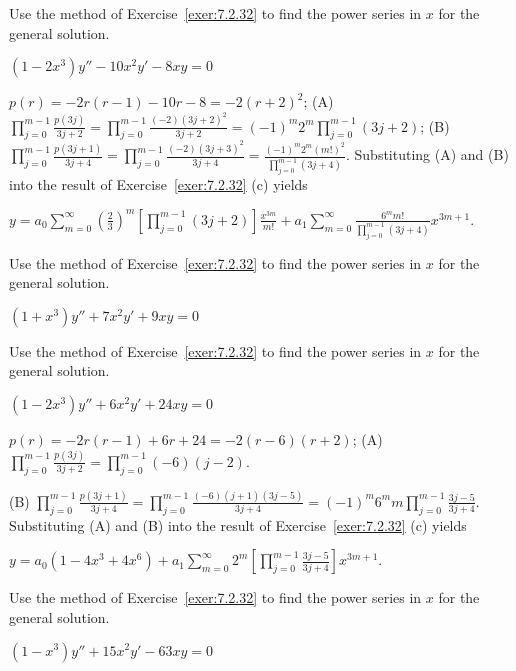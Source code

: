 \documentclass{ximera}
\begin{document}
\begin{problem}\label{exer:7.2.34}
Use the method of
Exercise~\ref{exer:7.2.32}  to find the power series in
$x$ for the general solution.

$(1-2x^3)y''-10x^2y'-8xy=0$

\begin{solution}
    $p(r)=-2r(r-1)-10r-8=-2(r+2)^2$;
(A) $\prod_{j=0}^{m-1}\frac{p(3j)}{3j+2}=
\prod_{j=0}^{m-1}\frac{(-2)(3j+2)^2}{3j+2}
=(-1)^m2^m\prod_{j=0}^{m-1}(3j+2)$;
(B) $\prod_{j=0}^{m-1}\frac{p(3j+1)}{3j+4}=
\prod_{j=0}^{m-1}\frac{(-2)(3j+3)^2}{3j+4}
=\frac{(-1)^m2^m(m!)^2}{\prod_{j=0}^{m-1}(3j+4)}$.
Substituting (A) and (B) into the
result of Exercise~\ref{exer:7.2.32} (c) yields

$y=a_0\sum_{m=0}^\infty
\left(\frac{2}{3}\right)^m\left[\prod_{j=0}^{m-1}(3j+2)\right]\frac{x^{3m}}{ m!}
+a_1\sum_{m=0}^\infty\frac{6^mm!}{\prod_{j=0}^{m-1}(3j+4)}x^{3m+1}$.
\end{solution}
\end{problem}

\begin{problem}\label{exer:7.2.35}
Use the method of
Exercise~\ref{exer:7.2.32}  to find the power series in
$x$ for the general solution.

$(1+x^3)y''+7x^2y'+9xy=0$
\end{problem}

\begin{problem}\label{exer:7.2.36}
Use the method of
Exercise~\ref{exer:7.2.32}  to find the power series in
$x$ for the general solution.

$(1-2x^3)y''+6x^2y'+24xy=0$

\begin{solution}
    $p(r)=-2r(r-1)+6r+24=-2(r-6)(r+2)$;
(A) $\prod_{j=0}^{m-1}\frac{p(3j)}{3j+2}=\prod_{j=0}^{m-1}
(-6)(j-2)$.


(B) $\prod_{j=0}^{m-1}\frac{p(3j+1)}{3j+4}=
\prod_{j=0}^{m-1}\frac{(-6)(j+1)(3j-5)}{3j+4}=
(-1)^m6^mm\prod_{j=0}^{m-1}\frac{3j-5}{3j+4}$.
Substituting (A) and (B) into the
result of Exercise~\ref{exer:7.2.32} (c) yields

$y=a_0(1-4x^3+4x^6)+a_1\sum_{m=0}^\infty
2^m\left[\prod_{j=0}^{m-1}\frac{3j-5}{3j+4}\right]x^{3m+1}$.
\end{solution}
\end{problem}

 \begin{problem}\label{exer:7.2.37}
 Use the method of
Exercise~\ref{exer:7.2.32}  to find the power series in
$x$ for the general solution.

$(1-x^3)y''+15x^2y'-63xy=0$
\end{problem}
\end{document}
